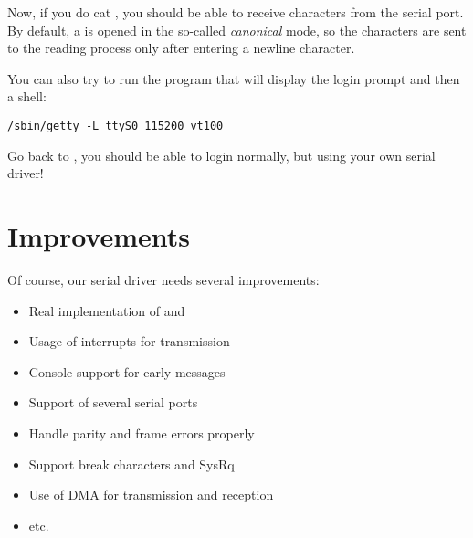 Now, if you do cat , you should be able to receive
characters from the serial port. By default, a  is opened in the
so-called {\em canonical} mode, so the characters are sent to the reading
process only after entering a newline character.

You can also try to run the program that will display the login prompt
and then a shell:

\begin{verbatim}
/sbin/getty -L ttyS0 115200 vt100
\end{verbatim}

Go back to , you should be able to login normally, but
using your own serial driver!

\section{Improvements}

Of course, our serial driver needs several improvements:

\begin{itemize}
\item Real implementation of  and 
\item Usage of interrupts for transmission
\item Console support for early messages
\item Support of several serial ports
\item Handle parity and frame errors properly
\item Support break characters and SysRq
\item Use of DMA for transmission and reception
\item etc.
\end{itemize}
